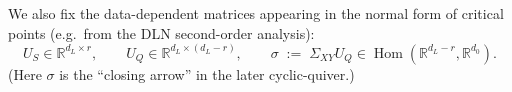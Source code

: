 \documentclass{article}
\newcommand{\Hom}{\operatorname{Hom}}
\newcommand{\R}{\mathbb{R}}
\newcommand{\Mat}{\mathrm{Mat}}
\theoremstyle{definition}
\begin{document}

\noindent
We also fix the data-dependent matrices appearing in the normal form of critical points (e.g.\ from the DLN second-order analysis):
\[
U_S\in \R^{d_L\times r},\qquad U_Q\in \R^{d_L\times(d_L-r)},\qquad
\sigma \;:=\; \Sigma_{XY}U_Q \in \Hom(\R^{d_L-r},\R^{d_0}).
\]
(Here $\sigma$ is the ``closing arrow'' in the later cyclic-quiver.)

\end{document}
